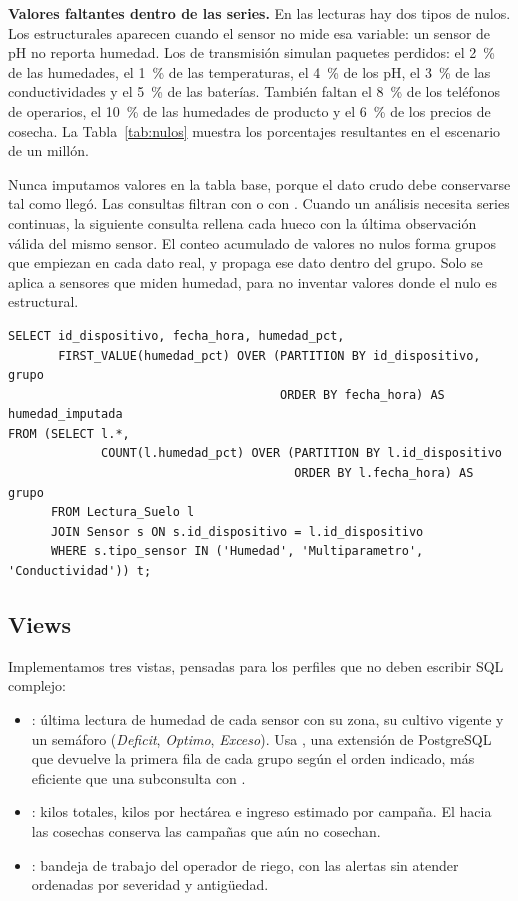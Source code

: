 \textbf{Valores faltantes dentro de las series.} En las lecturas hay dos tipos de nulos. Los estructurales aparecen cuando el sensor no mide esa variable: un sensor de pH no reporta humedad. Los de transmisión simulan paquetes perdidos: el 2~\% de las humedades, el 1~\% de las temperaturas, el 4~\% de los pH, el 3~\% de las conductividades y el 5~\% de las baterías. También faltan el 8~\% de los teléfonos de operarios, el 10~\% de las humedades de producto y el 6~\% de los precios de cosecha. La Tabla~\ref{tab:nulos} muestra los porcentajes resultantes en el escenario de un millón.


Nunca imputamos valores en la tabla base, porque el dato crudo debe conservarse tal como llegó. Las consultas filtran con  o con . Cuando un análisis necesita series continuas, la siguiente consulta rellena cada hueco con la última observación válida del mismo sensor. El conteo acumulado de valores no nulos forma grupos que empiezan en cada dato real, y  propaga ese dato dentro del grupo. Solo se aplica a sensores que miden humedad, para no inventar valores donde el nulo es estructural.

\begin{lstlisting}
SELECT id_dispositivo, fecha_hora, humedad_pct,
       FIRST_VALUE(humedad_pct) OVER (PARTITION BY id_dispositivo, grupo
                                      ORDER BY fecha_hora) AS humedad_imputada
FROM (SELECT l.*,
             COUNT(l.humedad_pct) OVER (PARTITION BY l.id_dispositivo
                                        ORDER BY l.fecha_hora) AS grupo
      FROM Lectura_Suelo l
      JOIN Sensor s ON s.id_dispositivo = l.id_dispositivo
      WHERE s.tipo_sensor IN ('Humedad', 'Multiparametro', 'Conductividad')) t;
\end{lstlisting}

\subsection{Views}

Implementamos tres vistas, pensadas para los perfiles que no deben escribir SQL complejo:

\begin{itemize}[leftmargin=1.4em,itemsep=0.1em]
\item {}: última lectura de humedad de cada sensor con su zona, su cultivo vigente y un semáforo (\emph{Deficit}, \emph{Optimo}, \emph{Exceso}). Usa , una extensión de PostgreSQL que devuelve la primera fila de cada grupo según el orden indicado, más eficiente que una subconsulta con .
\item {}: kilos totales, kilos por hectárea e ingreso estimado por campaña. El  hacia las cosechas conserva las campañas que aún no cosechan.
\item {}: bandeja de trabajo del operador de riego, con las alertas sin atender ordenadas por severidad y antigüedad.
\end{itemize}

